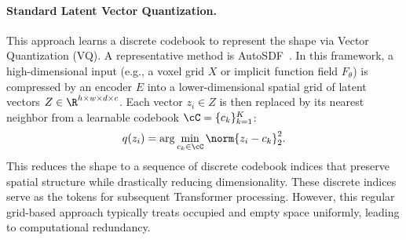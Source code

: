 \documentclass[../../book-main.tex]{subfiles}
\begin{document}
\paragraph{Standard Latent Vector Quantization.} This approach learns a discrete 
codebook to represent the shape via Vector Quantization (VQ).
A representative method is AutoSDF~\citep{mittal2022autosdf}. In this framework, a high-dimensional 
input (e.g., a voxel grid \(X\) or implicit function field \(F_\theta\)) 
is compressed by an encoder \(E\) into a 
lower-dimensional spatial grid of latent vectors \(Z \in \R^{h \times w \times d \times c}\).
Each vector \(z_i \in Z\) is then replaced by its nearest neighbor from a learnable codebook \(\cC=\{c_k\}_{k=1}^K\):
\begin{equation}
q(z_i) = \arg\min_{c_k \in \cC} \norm{z_i - c_k}_2^2 .
\end{equation}
This reduces the shape to a sequence of discrete codebook indices that preserve 
spatial structure while drastically reducing dimensionality.
These discrete indices 
serve as the tokens for subsequent Transformer processing.
However, this regular grid-based approach typically treats occupied and empty space uniformly, leading to computational redundancy.
\end{document}
